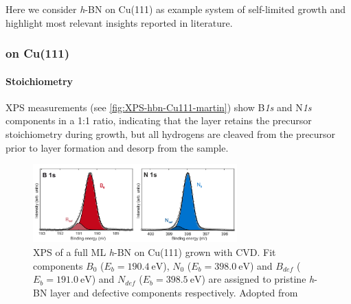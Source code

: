 Here we consider \textit{h}-BN on Cu(111) as example system of self-limited growth and highlight most relevant insights reported in literature.\cite{joshi_boron_2012, schwarz_corrugation_2017, auwarter_hexagonal_2018}

\subsubsection{on Cu(111)}
%	

	\paragraph{Stoichiometry}
	XPS measurements (see \autoref{fig:XPS-hbn-Cu111-martin}) show B\textit{1s} and N\textit{1s} components in a 1:1 ratio, indicating that the layer retains the precursor stoichiometry during growth, but all hydrogens are cleaved from the precursor prior to layer formation and desorp from the sample.\cite{Zhang_Two-dimensional_2017}
	
\begin{figure} \centering
	\includegraphics[width=0.7\textwidth]{./images/XPS-hbn-Cu111-martin}%
	\caption{XPS of a full ML \textit{h}-BN on Cu(111) grown with CVD. Fit components $B_0$ ($E_b=\SI{190.4}{\eV}$), $N_0$ ($E_b=\SI{398.0}{\eV}$) and $B_{def}$ ($E_b=\SI{191.0}{\eV}$) and $N_{def}$ ($E_b=\SI{398.5}{\eV}$) are assigned to pristine \textit{h}-BN layer and defective components respectively. Adopted from \cite{schwarz_assembly_2018}}
	\label{fig:XPS-hbn-Cu111-martin}
\end{figure}



